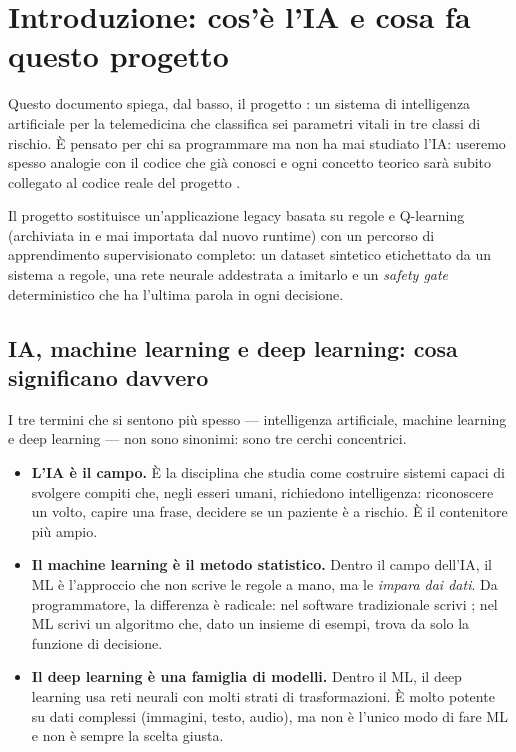 \chapter{Introduzione: cos'è l'IA e cosa fa questo progetto}\label{cap:introduzione}


Questo documento spiega, dal basso, il progetto \progetto{}: un sistema di
intelligenza artificiale per la telemedicina che classifica sei parametri
vitali in tre classi di rischio. È pensato per chi sa programmare ma non ha
mai studiato l'IA: useremo spesso analogie con il codice che già conosci e
ogni concetto teorico sarà subito collegato al codice reale del progetto
\cite{progetto2026}.

Il progetto sostituisce un'applicazione legacy basata su regole e Q-learning
(archiviata in  e mai importata
dal nuovo runtime) con un percorso di apprendimento supervisionato completo:
un dataset sintetico etichettato da un sistema a regole, una rete neurale
addestrata a imitarlo e un \emph{safety gate} deterministico che ha l'ultima
parola in ogni decisione.

\section{IA, machine learning e deep learning: cosa significano davvero}\label{sec:ia-ml-deep}

I tre termini che si sentono più spesso — intelligenza artificiale, machine
learning e deep learning — non sono sinonimi: sono tre cerchi concentrici.

\begin{itemize}
  \item \textbf{L'IA è il campo.} È la disciplina che studia come costruire
        sistemi capaci di svolgere compiti che, negli esseri umani,
        richiedono intelligenza: riconoscere un volto, capire una frase,
        decidere se un paziente è a rischio. È il contenitore più ampio.
  \item \textbf{Il machine learning è il metodo statistico.} Dentro il campo
        dell'IA, il ML è l'approccio che non scrive le regole a mano, ma le
        \emph{impara dai dati}. Da programmatore, la differenza è radicale:
        nel software tradizionale scrivi ; nel
        ML scrivi un algoritmo che, dato un insieme di esempi, trova da solo
        la funzione di decisione.
  \item \textbf{Il deep learning è una famiglia di modelli.} Dentro il ML, il
        deep learning usa reti neurali con molti strati di trasformazioni.
        È molto potente su dati complessi (immagini, testo, audio), ma non è
        l'unico modo di fare ML e non è sempre la scelta giusta.
\end{itemize}

